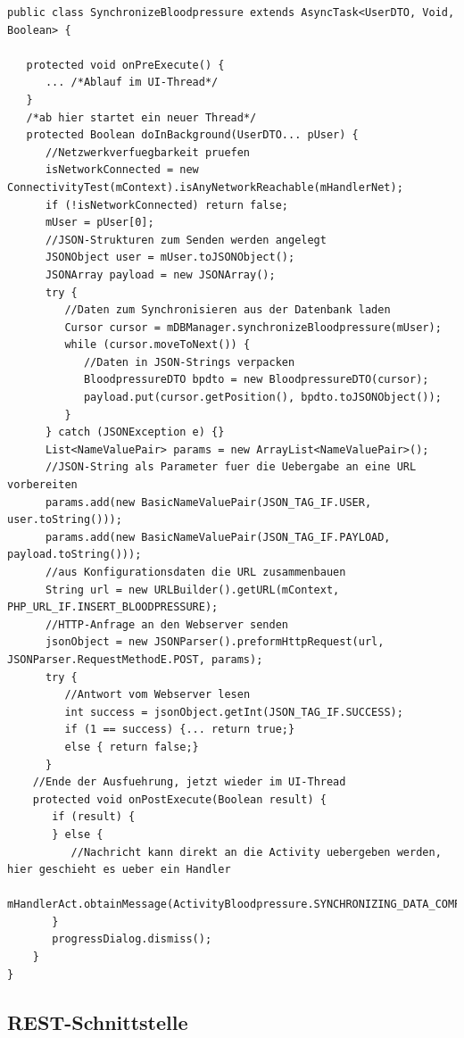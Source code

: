 \begin{lstlisting}[caption={SynchronizeBloodpressure sendet Blutdruckmesswerte an den Webserver}]
public class SynchronizeBloodpressure extends AsyncTask<UserDTO, Void, Boolean> {

   protected void onPreExecute() {
      ... /*Ablauf im UI-Thread*/
   } 
   /*ab hier startet ein neuer Thread*/
   protected Boolean doInBackground(UserDTO... pUser) {
      //Netzwerkverfuegbarkeit pruefen
      isNetworkConnected = new ConnectivityTest(mContext).isAnyNetworkReachable(mHandlerNet);
      if (!isNetworkConnected) return false;
      mUser = pUser[0];
      //JSON-Strukturen zum Senden werden angelegt
      JSONObject user = mUser.toJSONObject();
      JSONArray payload = new JSONArray();
      try {
         //Daten zum Synchronisieren aus der Datenbank laden
         Cursor cursor = mDBManager.synchronizeBloodpressure(mUser);
         while (cursor.moveToNext()) {
            //Daten in JSON-Strings verpacken
            BloodpressureDTO bpdto = new BloodpressureDTO(cursor);
            payload.put(cursor.getPosition(), bpdto.toJSONObject());
         }
      } catch (JSONException e) {}
      List<NameValuePair> params = new ArrayList<NameValuePair>();
      //JSON-String als Parameter fuer die Uebergabe an eine URL vorbereiten
      params.add(new BasicNameValuePair(JSON_TAG_IF.USER, user.toString()));
      params.add(new BasicNameValuePair(JSON_TAG_IF.PAYLOAD, payload.toString()));
      //aus Konfigurationsdaten die URL zusammenbauen
      String url = new URLBuilder().getURL(mContext, PHP_URL_IF.INSERT_BLOODPRESSURE);
      //HTTP-Anfrage an den Webserver senden
      jsonObject = new JSONParser().preformHttpRequest(url, JSONParser.RequestMethodE.POST, params);		
      try {
         //Antwort vom Webserver lesen
         int success = jsonObject.getInt(JSON_TAG_IF.SUCCESS);
         if (1 == success) {... return true;}
         else { return false;}
      }
    //Ende der Ausfuehrung, jetzt wieder im UI-Thread
    protected void onPostExecute(Boolean result) {
       if (result) {
       } else {
          //Nachricht kann direkt an die Activity uebergeben werden, hier geschieht es ueber ein Handler
          mHandlerAct.obtainMessage(ActivityBloodpressure.SYNCHRONIZING_DATA_COMPLETE).sendToTarget();
       }
       progressDialog.dismiss();
    }
}
\end{lstlisting}

\subsection{REST-Schnittstelle}

